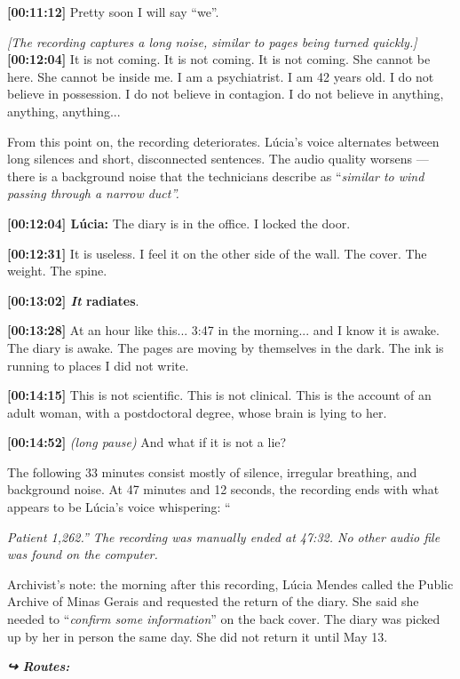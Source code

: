 \noindent \textbf{[00:11:12]} Pretty soon I will say \textquotedblleft{}we\textquotedblright{}.

\noindent \textit{[The recording captures a long noise, similar to pages being turned quickly.]}
\noindent \textbf{[00:12:04]} It is not coming. It is not coming. It is not coming. She cannot be here. She cannot be inside me. I am a psychiatrist. I am 42 years old. I do not believe in possession. I do not believe in contagion. I do not believe in anything, anything, anything...

\noindent From this point on, the recording deteriorates. Lúcia's voice alternates between long silences and short, disconnected sentences. The audio quality worsens --- there is a background noise that the technicians describe as \textquotedblleft{\textit{similar to wind passing through a narrow duct\textquotedblright{}.}}

\noindent \textbf{[00:12:04] Lúcia:} The diary is in the office. I locked the door.

\noindent \textbf{[00:12:31]} It is useless. I feel it on the other side of the wall. The cover. The weight. The spine.

\noindent \textbf{[00:13:02]\textit{ It }radiates}.

\noindent \textbf{[00:13:28]} At an hour like this... 3:47 in the morning... and I know it is awake. The diary is awake. The pages are moving by themselves in the dark. The ink is running to places I did not write.

\noindent \textbf{[00:14:15]} This is not scientific. This is not clinical. This is the account of an adult woman, with a postdoctoral degree, whose brain is lying to her.

\noindent \textbf{[00:14:52]} \textit{(long pause)} And what if it is not a lie?

\noindent The following 33 minutes consist mostly of silence, irregular breathing, and background noise. At 47 minutes and 12 seconds, the recording ends with what appears to be Lúcia's voice whispering: \textquotedblleft{\textit{Patient 1,262.\textquotedblright{} The recording was manually ended at 47:32. No other audio file was found on the computer.}

\noindent Archivist's note: the morning after this recording, Lúcia Mendes called the Public Archive of Minas Gerais and requested the return of the diary. She said she needed to \textquotedblleft{\textit{confirm some information}\textquotedblright{}} on the back cover. The diary was picked up by her in person the same day. She did not return it until May 13.}




\vspace{0.5em}
\noindent\textit{\textbf{↪ Routes:}  \rotasep {} \rotasep {} \rotasep {}}